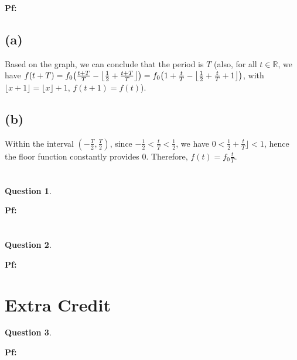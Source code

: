 \documentclass{article}
\newtheorem{question}{Question}
\newcommand{\RR}{\mathbb{R}}
\DeclarePairedDelimiter{\paran}{(}{)}%
\begin{document}
\textbf{Pf:}
\subsection*{(a)}
Based on the graph, we can conclude that the period is $T$ (also, for all $t \in \RR$, we have $f(t+T) = f_0\paran*{\frac{t+T}{T}-\left\lfloor\frac{1}{2}+\frac{t+T}{T}\right\rfloor}=f_0\paran*{1+\frac{t}{T}-\left\lfloor\frac{1}{2}+\frac{t}{T}+1\right\rfloor}$, with $\lfloor x+1\rfloor = \lfloor x\rfloor +1$, $f(t+1)=f(t)$).

\subsection*{(b)}
Within the interval $(-\frac{T}{2},\frac{T}{2})$, since $-\frac{1}{2}<\frac{t}{T}<\frac{1}{2} $, we have $0<\frac{1}{2}+\frac{t}{T}\rfloor<1$, hence the floor function constantly provides $0$. Therefore, $f(t) = f_0\frac{t}{T}$.

\break

\section{}
\begin{question}\label{q5}
\end{question}

\textbf{Pf:}

\break

\section{}
\begin{question}\label{q6}
\end{question}

\textbf{Pf:}

\break

\section{Extra Credit}
\begin{question}\label{q7}
\end{question}

\textbf{Pf:}

\break
\end{document}
